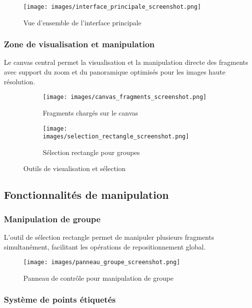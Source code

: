 \documentclass[11pt,a4paper]{report}
\begin{document}
\begin{figure}[htbp]
\centering
\texttt{[image: images/interface\_principale\_screenshot.png]}
\caption{Vue d'ensemble de l'interface principale}
\end{figure}

\subsubsection{Zone de visualisation et manipulation}

Le canvas central permet la visualisation et la manipulation directe des fragments avec support du zoom et du panoramique optimisés pour les images haute résolution.

\begin{figure}[htbp]
\centering
\begin{subfigure}[b]{0.48\textwidth}
    \texttt{[image: images/canvas\_fragments\_screenshot.png]}
    \caption{Fragments chargés sur le canvas}
\end{subfigure}
\hfill
\begin{subfigure}[b]{0.48\textwidth}
    \texttt{[image: images/selection\_rectangle\_screenshot.png]}
    \caption{Sélection rectangle pour groupes}
\end{subfigure}
\caption{Outils de visualisation et sélection}
\end{figure}

\subsection{Fonctionnalités de manipulation}

\subsubsection{Manipulation de groupe}

L'outil de sélection rectangle permet de manipuler plusieurs fragments simultanément, facilitant les opérations de repositionnement global.

\begin{figure}[htbp]
\centering
\texttt{[image: images/panneau\_groupe\_screenshot.png]}
\caption{Panneau de contrôle pour manipulation de groupe}
\end{figure}

\subsubsection{Système de points étiquetés}
\end{document}

